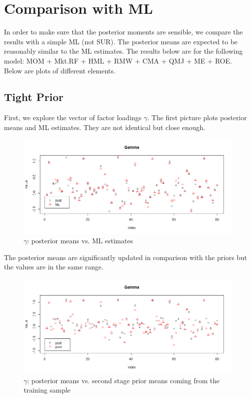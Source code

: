 \documentclass[12pt]{article}
\begin{document}
\section{Comparison with ML}
In order to make sure that the posterior moments are sensible, we compare the results with a simple ML (not SUR). The posterior means are expected to be reasonably similar to the ML estimates. The results below are for the following model:   MOM + Mkt.RF + HML + RMW + CMA + QMJ + ME + ROE. Below are plots of different elements.\\
\subsection{Tight Prior}
First, we explore the vector of factor loadings $\gamma$. The first picture plots posterior means and ML estimates. They are not identical but close enough. 
\begin{figure}[!h]
	\centering
	\includegraphics[width=15cm]{Pics/PlotGammaPostML.png}
	\caption{$\gamma$: posterior means vs. ML estimates}
\end{figure}
The posterior means are significantly updated in comparison with the priors but the values are in the same range.
\begin{figure}[!h]
	\centering
	\includegraphics[width=15cm]{Pics/PlotGammaPostPrior.png}
	\caption{$\gamma$: posterior means vs. second stage prior means coming from the training sample}
\end{figure}
\end{document}

